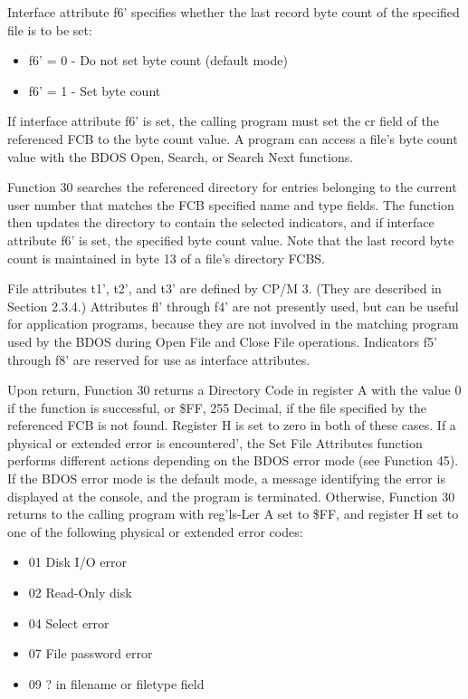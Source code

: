 Interface attribute f6' specifies whether the last record byte count
of the specified file is to be set:

\begin{itemize}
\item f6' = 0 - Do not set byte count (default mode)
\item f6' = 1 - Set byte count
\end{itemize}

If interface attribute f6' is set, the calling program must set the cr
field of the referenced FCB to the byte count value. A program can
access a file's byte count value with the BDOS Open, Search, or Search
Next functions.

Function 30 searches the referenced directory for entries belonging to
the current user number that matches the FCB specified name and type
fields. The function then updates the directory to contain the
selected indicators, and if interface attribute f6' is set, the
specified byte count value. Note that the last record byte count is
maintained in byte 13 of a file's directory FCBS.

File attributes t1', t2', and t3' are defined by CP/M 3. (They are
described in Section 2.3.4.) Attributes fl' through f4' are not
presently used, but can be useful for application programs, because
they are not involved in the matching program used by the BDOS during
Open File and Close File operations. Indicators f5' through f8' are
reserved for use as interface attributes.

Upon return, Function 30 returns a Directory Code in register A with
the value 0 if the function is successful, or \$FF, 255 Decimal, if
the file specified by the referenced FCB is not found. Register H is
set to zero in both of these cases. If a physical or extended error is
encountered', the Set File Attributes function performs different
actions depending on the BDOS error mode (see Function 45). If the
BDOS error mode is the default mode, a message identifying the error
is displayed at the console, and the program is terminated. Otherwise,
Function 30 returns to the calling program with reg'ls-Ler A set to
\$FF, and register H set to one of the following physical or extended
error codes:

\begin{itemize}
\item 01 Disk I/O error
\item 02 Read-Only disk
\item 04 Select error
\item 07 File password error
\item 09 ? in filename or filetype field
\end{itemize}

